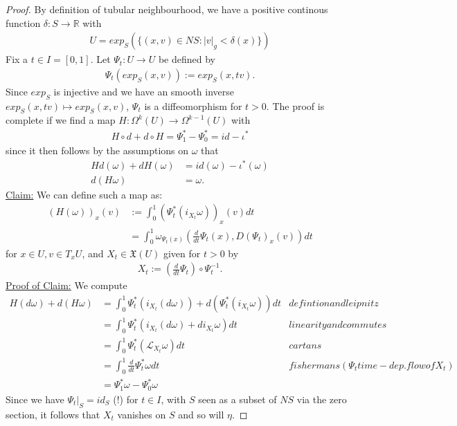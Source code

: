 \begin{proof}
By definition of tubular neighbourhood, we have a positive continous function $\delta : S \to \mathbb{R}$ with 
\begin{align*}
U = exp_S(\{ (x,v) \in NS : |v|_g < \delta(x) \})
\end{align*}
Fix a $t \in I =[0,1]$. Let $\Psi_t: U \to U$ be defined by
\begin{align*}
\Psi_t(exp_S(x,v)) := exp_S(x,tv) .
\end{align*}
Since $exp_S$ is injective and we have an smooth inverse $exp_S(x,tv) \mapsto exp_S(x,v)$, $\Psi_t$ is a diffeomorphism for $t>0$.
The proof is complete if we find a map $H: \Omega^k(U) \to \Omega^{k-1}(U)$  with
\begin{align*}
H \circ d + d \circ H = \Psi^*_1 - \Psi^*_0 = id - \iota^*
\end{align*}
since it then follows by the assumptions on $\omega$ that
\begin{align*}
H  d(\omega) + d  H(\omega) &= id(\omega) - \iota^*(\omega) \\
d(H\omega) &= \omega .
\end{align*} 
\underline{Claim:} We can define such a map as:
\begin{align*}
(H(\omega))_x(v) &:= \int^1_0 (\Psi^*_t(i_{X_t} \omega))_x(v) dt \\
&= \int^1_0 \omega_{\Psi_t(x)} \left( \frac{d}{dt} \Psi_t(x), D(\Psi_t)_x(v) \right) dt
\end{align*}
for $x\in U , v\in T_xU$, and $X_t \in \mathfrak{X}(U)$ given for $t>0$ by
\begin{align*}
X_t := \left( \frac{d}{dt} \Psi_t \right) \circ \Psi^{-1}_t .
\end{align*}
\underline{Proof of Claim:}
We compute
\begin{align*}
H(d\omega) + d(H\omega) &= \int^1_0 \Psi^*_t(i_{X_t}(d\omega))+ d(\Psi^*_t(i_{X_t}\omega)) dt &defintion and leipnitz\\
&= \int^1_0 \Psi^*_t(i_{X_t}(d\omega) + d i_{X_t}\omega) dt & linearity and commutes \\
&= \int^1_0 \Psi^*_t (\mathcal{L}_{X_t} \omega) dt & cartans \\
&= \int^1_0 \frac{d}{dt} \Psi^*_t \omega dt & fishermans (\Psi_t time-dep. flow of X_t)\\
&= \Psi^*_1 \omega - \Psi^*_0 \omega 
\end{align*}
Since we have $\Psi_t|_S = id_S$ (!) for $t \in I$, with $S$ seen as a subset of $NS$ via the zero section, it follows that $X_t$ vanishes on $S$ and so will $\eta$.
\end{proof}


